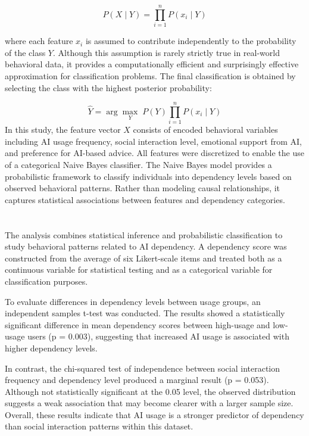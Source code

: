 \documentclass[10pt,a4paper]{article}
\begin{document}
\[
P(X \mid Y) = \prod_{i=1}^{n} P(x_i \mid Y)
\]

where each feature $x_i$ is assumed to contribute independently to the probability of the class $Y$.
Although this assumption is rarely strictly true in real-world behavioral data, it provides a computationally efficient and surprisingly effective approximation for classification problems.
The final classification is obtained by selecting the class with the highest posterior probability:

\[
\hat{Y} = \arg\max_Y \; P(Y) \prod_{i=1}^{n} P(x_i \mid Y)
\]
In this study, the feature vector $X$ consists of encoded behavioral variables including AI usage frequency, social interaction level, emotional support from AI, and preference for AI-based advice. All features were discretized to enable the use of a categorical Naive Bayes classifier.
The Naive Bayes model provides a probabilistic framework to classify individuals into dependency levels based on observed behavioral patterns. Rather than modeling causal relationships, it captures statistical associations between features and dependency categories.

\section{{\color{colorIPN}{Results and Discussion}}}
The analysis combines statistical inference and probabilistic classification to study behavioral patterns related to AI dependency. A dependency score was constructed from the average of six Likert-scale items and treated both as a continuous variable for statistical testing and as a categorical variable for classification purposes.

To evaluate differences in dependency levels between usage groups, an independent samples t-test was conducted. The results showed a statistically significant difference in mean dependency scores between high-usage and low-usage users (p = 0.003), suggesting that increased AI usage is associated with higher dependency levels.

In contrast, the chi-squared test of independence between social interaction frequency and dependency level produced a marginal result (p = 0.053). Although not statistically significant at the 0.05 level, the observed distribution suggests a weak association that may become clearer with a larger sample size. Overall, these results indicate that AI usage is a stronger predictor of dependency than social interaction patterns within this dataset.
\end{document}
